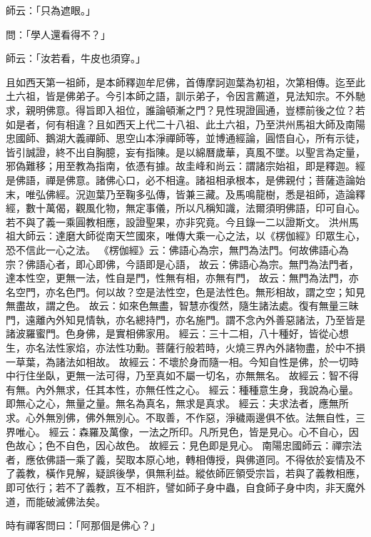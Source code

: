 師云：「只為遮眼。」

問：「學人還看得不？」

師云：「汝若看，牛皮也須穿。」

且如西天第一祖師，是本師釋迦牟尼佛，首傳摩訶迦葉為初祖，次第相傳。迄至此土六祖，皆是佛弟子。今引本師之語，訓示弟子，令因言薦道，見法知宗。不外馳求，親明佛意。得旨即入祖位，誰論頓漸之門？見性現證圓通，豈標前後之位？若如是者，何有相違？且如西天上代二十八祖、此土六祖，乃至洪州馬祖大師及南陽忠國師、鵝湖大義禪師、思空山本淨禪師等，並博通經論，圓悟自心，所有示徒，皆引誠證，終不出自胸臆，妄有指陳。是以綿曆歲華，真風不墜。以聖言為定量，邪偽難移；用至教為指南，依憑有據。故圭峰和尚云：謂諸宗始祖，即是釋迦。經是佛語，禪是佛意。諸佛心口，必不相違。諸祖相承根本，是佛親付；菩薩造論始末，唯弘佛經。況迦葉乃至鞠多弘傳，皆兼三藏。及馬鳴龍樹，悉是祖師，造論釋經，數十萬偈，觀風化物，無定事儀，所以凡稱知識，法爾須明佛語，印可自心。若不與了義一乘圓教相應，設證聖果，亦非究竟。今且錄一二以證斯文。
洪州馬祖大師云：{\kaishu 達磨大師從南天竺國來，唯傳大乘一心之法，以《楞伽經》印眾生心，恐不信此一心之法}。
《楞伽經》云：{\kaishu 佛語心為宗，無門為法門}。何故佛語心為宗？佛語心者，即心即佛，今語即是心語，
故云：{\kaishu 佛語心為宗}。無門為法門者，達本性空，更無一法，性自是門，性無有相，亦無有門，
故云：{\kaishu 無門為法門，亦名空門，亦名色門}。何以故？空是法性空，色是法性色。無形相故，謂之空；知見無盡故，謂之色。
故云：{\kaishu 如來色無盡，智慧亦復然，隨生諸法處}。復有無量三昧門，遠離內外知見情執，亦名總持門，亦名施門。謂不念內外善惡諸法，乃至皆是諸波羅蜜門。色身佛，是實相佛家用。
經云：{\kaishu 三十二相，八十種好，皆從心想生，亦名法性家焰，亦法性功勳}。菩薩行般若時，火燒三界內外諸物盡，於中不損一草葉，為諸法如相故。
故經云：{\kaishu 不壞於身而隨一相}。今知自性是佛，於一切時中行住坐臥，更無一法可得，乃至真如不屬一切名，亦無無名。
故經云：{\kaishu 智不得有無}。內外無求，任其本性，亦無任性之心。
經云：{\kaishu 種種意生身，我說為心量}。即無心之心，無量之量。無名為真名，無求是真求。
經云：{\kaishu 夫求法者，應無所求}。心外無別佛，佛外無別心。不取善，不作惡，淨穢兩邊俱不依。法無自性，三界唯心。
經云：{\kaishu 森羅及萬像，一法之所印}。凡所見色，皆是見心。心不自心，因色故心；色不自色，因心故色。
故經云：{\kaishu 見色即是見心}。
南陽忠國師云：{\kaishu 禪宗法者，應依佛語一乘了義，契取本原心地，轉相傳授，與佛道同。不得依於妄情及不了義教，橫作見解，疑誤後學，俱無利益}。縱依師匠領受宗旨，若與了義教相應，即可依行；若不了義教，互不相許，譬如師子身中蟲，自食師子身中肉，非天魔外道，而能破滅佛法矣。

時有禪客問曰：「阿那個是佛心？」

